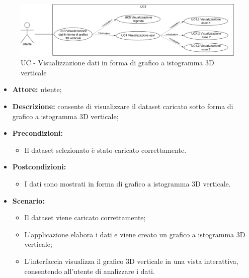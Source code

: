 \begin{figure}[h!]
    \centering
    \includegraphics[scale=0.7]{template/images/UC3.png}
    \caption{UC - Visualizzazione dati in forma di grafico a istogramma 3D verticale}
\end{figure}
\begin{itemize}
    \item \textbf{Attore:} utente;
    \item \textbf{Descrizione:} consente di visualizzare il dataset caricato sotto forma di grafico a istogramma 3D verticale;
    \item \textbf{Precondizioni:}
    \begin{itemize}
        \item Il dataset selezionato è stato caricato correttamente.
    \end{itemize}
    \item \textbf{Postcondizioni:}
    \begin{itemize}
        \item I dati sono mostrati in forma di grafico a istogramma 3D verticale.
    \end{itemize}
    \item \textbf{Scenario:}
    \begin{itemize}
        \item Il dataset viene caricato correttamente;
        \item L'applicazione elabora i dati e viene creato un grafico a istogramma 3D verticale;
        \item L'interfaccia visualizza il grafico 3D verticale in una vista interattiva, consentendo all'utente di analizzare i dati.
    \end{itemize}
\end{itemize}



